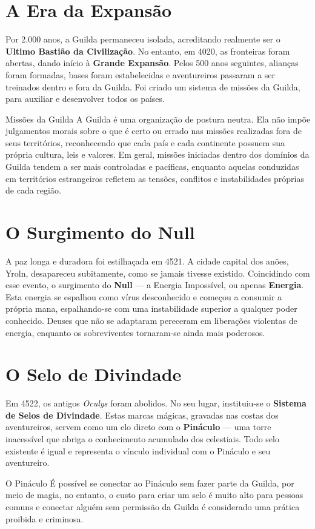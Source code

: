 \section*{A Era da Expansão}
Por 2.000 anos, a Guilda permaneceu isolada, acreditando realmente ser o \textbf{Ultimo Bastião da Civilização}. No entanto, em 4020, as fronteiras foram abertas, dando início à \textbf{Grande Expansão}. Pelos 500 anos seguintes, alianças foram formadas, bases foram estabelecidas e aventureiros passaram a ser treinados dentro e fora da Guilda. Foi criado um sistema de missões da Guilda, para auxiliar e desenvolver todos os países.

\begin{rpgboxtips}{Missões da Guilda}
A Guilda é uma organização de postura neutra. Ela não impõe julgamentos morais sobre o que é certo ou errado nas missões realizadas fora de seus territórios, reconhecendo que cada país e cada continente possuem sua própria cultura, leis e valores. Em geral, missões iniciadas dentro dos domínios da Guilda tendem a ser mais controladas e pacíficas, enquanto aquelas conduzidas em territórios estrangeiros refletem as tensões, conflitos e instabilidades próprias de cada região.
\end{rpgboxtips}

\section*{O Surgimento do Null}
A paz longa e duradora foi estilhaçada em 4521. A cidade capital dos anões, Yroln, desapareceu subitamente, como se jamais tivesse existido. Coincidindo com esse evento, o surgimento do \textbf{Null} — a Energia Impossível, ou apenas \textbf{Energia}. Esta energia se espalhou como vírus desconhecido e começou a consumir a própria mana, espalhando-se com uma instabilidade superior a qualquer poder conhecido. Deuses que não se adaptaram pereceram em liberações violentas de energia, enquanto os sobreviventes tornaram-se ainda mais poderosos.

\section*{O Selo de Divindade}
Em 4522, os antigos \textit{Oculys} foram abolidos. No seu lugar, instituiu-se o \textbf{Sistema de Selos de Divindade}. Estas marcas mágicas, gravadas nas costas dos aventureiros, servem como um elo direto com o \textbf{Pináculo} — uma torre inacessível que abriga o conhecimento acumulado dos celestiais. Todo selo existente é igual e representa o vínculo individual com o Pináculo e seu aventureiro.

\begin{rpgboxtips}{O Pináculo}
    É possível se conectar ao Pináculo sem fazer parte da Guilda, por meio de magia, no entanto, o custo para criar um selo é muito alto para pessoas comuns e conectar alguém sem permissão da Guilda é considerado uma prática proibida e criminosa. 
\end{rpgboxtips}

